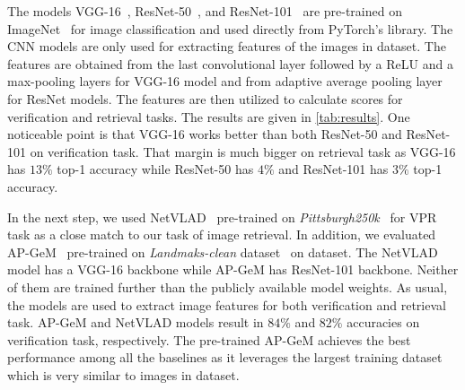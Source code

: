 \documentclass[a4paper,conference]{IEEEtran}
\begin{document}
The models VGG-16~\cite{simonyan2014very}, ResNet-50~\cite{he2016deep}, and ResNet-101~\cite{arandjelovic2016netvlad} are pre-trained on ImageNet~\cite{deng2009imagenet} for image classification and used directly from PyTorch's library. The CNN models are only used for extracting features of the images in \amstertime dataset. The features are obtained from the last convolutional layer followed by a ReLU and a max-pooling layers for VGG-16 model and from adaptive average pooling layer for ResNet models. The features are then utilized to calculate scores for verification and retrieval tasks. The results are given in \cref{tab:results}. One noticeable point is that VGG-16 works better than both ResNet-50 and ResNet-101 on verification task. That margin is much bigger on retrieval task as VGG-16 has $13\%$ top-1 accuracy while ResNet-50 has $4\%$ and ResNet-101 has $3\%$ top-1 accuracy.

In the next step, we used  NetVLAD~\cite{arandjelovic2016netvlad} pre-trained on \textit{Pittsburgh250k}~\cite{Torii2013} for VPR task as a close match to our task of image retrieval. In addition, we evaluated  AP-GeM~\cite{revaud2019apgem}  pre-trained on \textit{Landmaks-clean} dataset~\cite{gordo2016deep} on \amstertime dataset. The NetVLAD model has a VGG-16 backbone while AP-GeM has ResNet-101 backbone. Neither of them are trained further than the publicly available model weights. As usual, the models are used to extract image features for both verification and retrieval task. AP-GeM and NetVLAD models result in $84\%$ and  $82\%$ accuracies on verification task, respectively. The pre-trained AP-GeM achieves the best performance among all the baselines as it leverages the largest training dataset which is very similar to images in \amstertime dataset.
\end{document}
